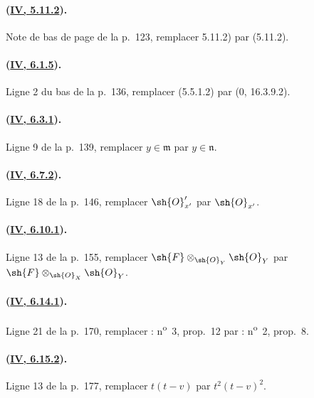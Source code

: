 \paragraph{({\texorpdfstring{\protect\hyperlink{ega4.c04.cor.5-11-2}{IV, 5.11.2}}{IV, 5.11.2}}).}
Note de bas de page de la p.~123, remplacer 5.11.2) par (5.11.2).

\paragraph{({\texorpdfstring{\protect\hyperlink{ega4.c04.prop.6-1-5}{IV, 6.1.5}}{IV, 6.1.5}}).}
Ligne 2 du bas de la p.~136, remplacer (5.5.1.2) par
($0$, 16.3.9.2).

\paragraph{({\texorpdfstring{\protect\hyperlink{ega4.c04.prop.6-3-1}{IV, 6.3.1}}{IV, 6.3.1}}).}
Ligne 9 de la p.~139, remplacer $y\in\mathfrak m$ par
$y\in\mathfrak n$.

\paragraph{({\texorpdfstring{\protect\hyperlink{ega4.c04.cor.6-7-2}{IV, 6.7.2}}{IV, 6.7.2}}).}
Ligne 18 de la p.~146, remplacer $\sh{O}'_{x'}$ par $\sh{O}_{x'}$.

\paragraph{({\texorpdfstring{\protect\hyperlink{ega4.c04.statement.6-10-1}{IV, 6.10.1}}{IV, 6.10.1}}).}
Ligne 13 de la p.~155, remplacer
$\sh{F}\otimes_{\sh{O}_Y}\sh{O}_Y$ par
$\sh{F}\otimes_{\sh{O}_X}\sh{O}_Y$.

\paragraph{({\texorpdfstring{\protect\hyperlink{ega4.c04.prop.6-14-1}{IV, 6.14.1}}{IV, 6.14.1}}).}
Ligne 21 de la p.~170, remplacer : n\textsuperscript{o}~3, prop.~12
par : n\textsuperscript{o}~2, prop.~8.

\paragraph{({\texorpdfstring{\protect\hyperlink{ega4.c04.statement.6-15-2}{IV, 6.15.2}}{IV, 6.15.2}}).}
Ligne 13 de la p.~177, remplacer $t(t-v)$ par $t^2(t-v)^2$.

